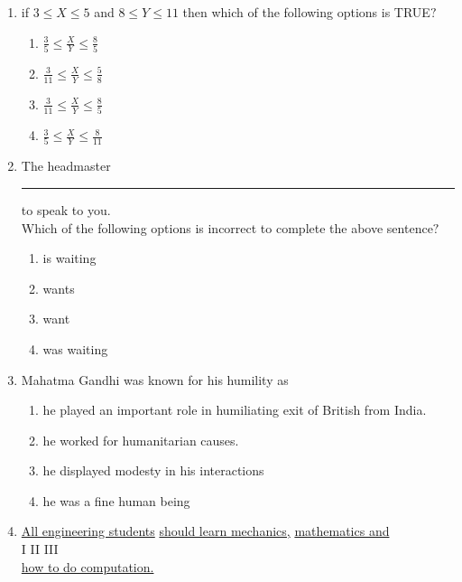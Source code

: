 \documentclass[journal]{IEEEtran}
\begin{document}
\begin{enumerate}[start=1]
	\item if $3\leq X\leq5$ and $8\leq Y\leq11$ then which of the following options is TRUE$?$
\begin{enumerate}
    \item $\frac{3}{5}\leq\frac{X}{Y}\leq\frac{8}{5}$\\
    
    \item $\frac{3}{11}\leq\frac{X}{Y}\leq\frac{5}{8}$\\
    
    \item $\frac{3}{11}\leq\frac{X}{Y}\leq\frac{8}{5}$\\
    
    \item $\frac{3}{5}\leq\frac{X}{Y}\leq\frac{8}{11}$
\end{enumerate}
    \item The headmaster \rule{3cm}{0.4pt} to speak to you.\\
    Which of the following options is incorrect to complete the above sentence$?$
    \begin{enumerate}
        \item is waiting
        \item wants
        \item want
        \item was waiting
    \end{enumerate}
\item Mahatma Gandhi was known for his humility as
      \begin{enumerate}
        \item he played an important role in humiliating exit of British from India.
        \item he worked for humanitarian causes.
        \item he displayed modesty in his interactions
        \item he was a fine human being
      \end{enumerate}
\item \underline{All engineering students} \underline{should  learn mechanics,} \underline {mathematics and} \\
\hspace{4cm}  I  \hspace{5cm} II \hspace{3cm} III \\
\underline{how to do computation.}\\

\end{enumerate}
\end{document}
